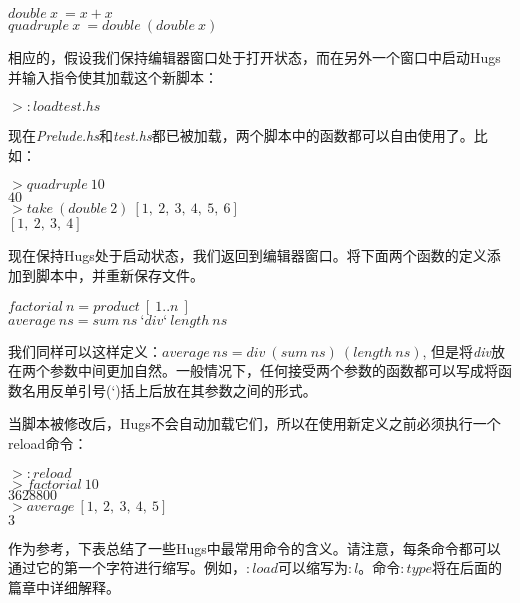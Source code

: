 \noindent\hspace*{1cm} $double~x~= x + x$\\
\hspace*{1cm} $quadruple~x~= double~(double~x)$

相应的，假设我们保持编辑器窗口处于打开状态，而在另外一个窗口中启动Hugs并输入指令使其加载这个新脚本：

\noindent\hspace*{1cm} $> :load test.hs$

现在\textit{Prelude.hs}和\textit{test.hs}都已被加载，两个脚本中的函数都可以自由使用了。比如：

\noindent\hspace*{1cm} $> quadruple~10$\\
\hspace*{1cm} $40$\\
\hspace*{1cm} $> take~(double~2)~[1,~2,~3,~4,~5,~6]$\\
\hspace*{1cm} $[1,~2,~3,~4]$

现在保持Hugs处于启动状态，我们返回到编辑器窗口。将下面两个函数的定义添加到脚本中，并重新保存文件。

\noindent\hspace*{1cm} $factorial~n = product~[~1..n~]$\\
\hspace*{1cm} $average~ns = sum~ns~‘div ‘~length~ns$

我们同样可以这样定义：$average~ns = div~(sum~ns)~(length~ns)$,
但是将\textit{div}放在两个参数中间更加自然。一般情况下，任何接受两个参数的函数都可以写成将函数名用反单引号(`)括上后放在其参数之间的形式。

当脚本被修改后，Hugs不会自动加载它们，所以在使用新定义之前必须执行一个reload命令：

\noindent\hspace*{1cm} $> :reload$\\
\hspace*{1cm} $> factorial~10$\\
\hspace*{1cm} $3628800$\\
\hspace*{1cm} $> average~[1,~2,~3,~4,~5]$\\
\hspace*{1cm} $3$

作为参考，下表总结了一些Hugs中最常用命令的含义。请注意，每条命令都可以通过它的第一个字符进行缩写。例如，$:load$可以缩写为$:l$。命令$:type$将在后面的篇章中详细解释。

